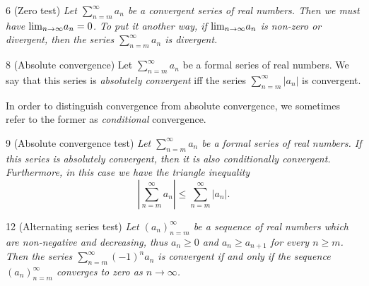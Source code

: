 \begin{corollary}{6}
    \label{series-zero-test}
    (Zero test) \emph{Let $\sum_{n=m}^{\infty} a_n$ be a convergent series of real
    numbers. Then we must have $\text{lim}_{n \rightarrow \infty}{a_n} = 0$. To put it another way, if
    $\text{lim}_{n \rightarrow \infty}{a_n}$ is non-zero or divergent, then the series $\sum_{n=m}^{\infty} a_n$
    is divergent.}
\end{corollary}

\begin{definition}{8}
    \label{absolute-convergence}
    (Absolute convergence) Let $\sum_{n=m}^{\infty} a_n$ be a formal series of real
    numbers. We say that this series is \emph{absolutely convergent} iff the series
    $\sum_{n=m}^{\infty} |a_n|$ is convergent.

    In order to distinguish convergence from absolute convergence, we sometimes
    refer to the former as \emph{conditional} convergence.
\end{definition}

\begin{proposition}{9}
    \label{absolute-convergence-test}
    (Absolute convergence test) \emph{Let $\sum_{n=m}^{\infty} a_n$ be a formal series
    of real numbers. If this series is absolutely convergent, then it is also
    conditionally convergent. Furthermore, in this case we have the triangle
    inequality
    \begin{equation*}
        |\sum_{n=m}^{\infty} a_n| \leq \sum_{n=m}^{\infty} |a_n|.
    \end{equation*}}
\end{proposition}

\begin{proposition}{12}
    \label{alternating-series-test}
    (Alternating series test) \emph{Let $(a_n)_{n=m}^{\infty}$ be a sequence of real
    numbers which are non-negative and decreasing, thus $a_n \geq 0$ and $a_{n} \geq a_{n+1}$
    for every $n \geq m$. Then the series $\sum_{n=m}^{\infty} (-1)^n a_n$ is convergent
    if and only if the sequence $(a_n)_{n=m}^{\infty}$ converges to zero as $n \rightarrow \infty$.}
\end{proposition}

